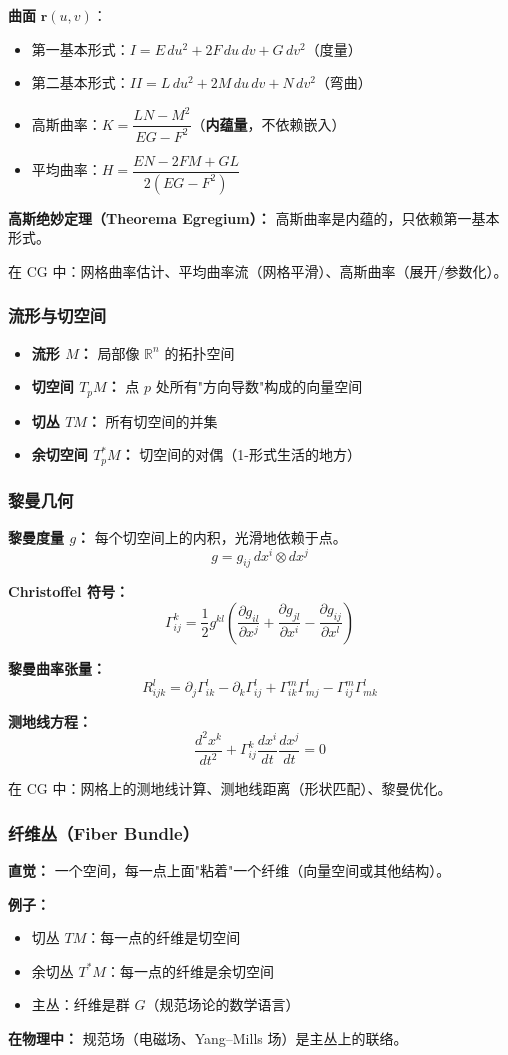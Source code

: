 \textbf{曲面} $\mathbf{r}(u,v)$：
\begin{itemize}
  \item 第一基本形式：$I = E\,du^2 + 2F\,du\,dv + G\,dv^2$（度量）
  \item 第二基本形式：$II = L\,du^2 + 2M\,du\,dv + N\,dv^2$（弯曲）
  \item 高斯曲率：$K = \dfrac{LN - M^2}{EG - F^2}$（\textbf{内蕴量}，不依赖嵌入）
  \item 平均曲率：$H = \dfrac{EN - 2FM + GL}{2(EG - F^2)}$
\end{itemize}

\textbf{高斯绝妙定理（Theorema Egregium）：} 高斯曲率是内蕴的，只依赖第一基本形式。

在 CG 中：网格曲率估计、平均曲率流（网格平滑）、高斯曲率（展开/参数化）。

\subsubsection{流形与切空间}

\begin{itemize}
  \item \textbf{流形 $M$：} 局部像 $\mathbb{R}^n$ 的拓扑空间
  \item \textbf{切空间 $T_pM$：} 点 $p$ 处所有"方向导数"构成的向量空间
  \item \textbf{切丛 $TM$：} 所有切空间的并集
  \item \textbf{余切空间 $T_p^*M$：} 切空间的对偶（1-形式生活的地方）
\end{itemize}

\subsubsection{黎曼几何}

\textbf{黎曼度量 $g$：} 每个切空间上的内积，光滑地依赖于点。
\[
g = g_{ij}\,dx^i \otimes dx^j
\]

\textbf{Christoffel 符号：}
\[
\Gamma^k_{ij} = \frac{1}{2}g^{kl}\left(\frac{\partial g_{il}}{\partial x^j} + \frac{\partial g_{jl}}{\partial x^i} - \frac{\partial g_{ij}}{\partial x^l}\right)
\]

\textbf{黎曼曲率张量：}
\[
R^l_{ijk} = \partial_j \Gamma^l_{ik} - \partial_k \Gamma^l_{ij} + \Gamma^m_{ik}\Gamma^l_{mj} - \Gamma^m_{ij}\Gamma^l_{mk}
\]

\textbf{测地线方程：}
\[
\frac{d^2 x^k}{dt^2} + \Gamma^k_{ij}\frac{dx^i}{dt}\frac{dx^j}{dt} = 0
\]

在 CG 中：网格上的测地线计算、测地线距离（形状匹配）、黎曼优化。

\subsubsection{纤维丛（Fiber Bundle）}

\textbf{直觉：} 一个空间，每一点上面"粘着"一个纤维（向量空间或其他结构）。

\textbf{例子：}
\begin{itemize}
  \item 切丛 $TM$：每一点的纤维是切空间
  \item 余切丛 $T^*M$：每一点的纤维是余切空间
  \item 主丛：纤维是群 $G$（规范场论的数学语言）
\end{itemize}

\textbf{在物理中：} 规范场（电磁场、Yang--Mills 场）是主丛上的联络。